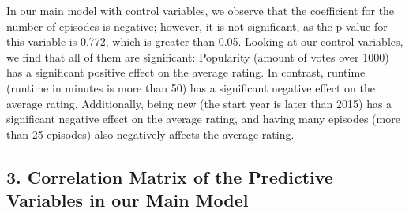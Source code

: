 \documentclass[
]{article}
\begin{document}
In our main model with control variables, we observe that the
coefficient for the number of episodes is negative; however, it is not
significant, as the p-value for this variable is 0.772, which is greater
than 0.05. Looking at our control variables, we find that all of them
are significant: Popularity (amount of votes over 1000) has a
significant positive effect on the average rating. In contrast, runtime
(runtime in minutes is more than 50) has a significant negative effect
on the average rating. Additionally, being new (the start year is later
than 2015) has a significant negative effect on the average rating, and
having many episodes (more than 25 episodes) also negatively affects the
average rating.

\subsection{3. Correlation Matrix of the Predictive Variables in our
Main
Model}\label{correlation-matrix-of-the-predictive-variables-in-our-main-model}
\end{document}
